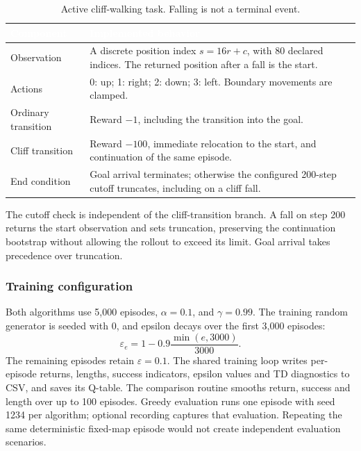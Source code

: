 \documentclass[11pt,a4paper]{article}
\theoremstyle{definition}
\theoremstyle{plain}
\theoremstyle{remark}
\newcommand{\thcell}[1]{\textcolor{white}{\textbf{#1}}}
\begin{document}
\begin{table}[tbp]
\centering\small
\begin{tabularx}{\linewidth}{@{}p{3.0cm}Y@{}}
\toprule
{}\thcell{Component}&\thcell{Implemented behavior}\\
\midrule
Observation & A discrete position index $s=16r+c$, with 80 declared indices. The returned position after a fall is the start.\\
 Actions & 0: up; 1: right; 2: down; 3: left. Boundary movements are clamped.\\
Ordinary transition & Reward $-1$, including the transition into the goal.\\
 Cliff transition & Reward $-100$, immediate relocation to the start, and continuation of the same episode.\\
End condition & Goal arrival terminates; otherwise the configured 200-step cutoff truncates, including on a cliff fall.\\
\bottomrule
\end{tabularx}
\caption{Active cliff-walking task. Falling is not a terminal event.}
\label{tab:cliff-env}
\end{table}

The cutoff check is independent of the cliff-transition branch. A fall on step 200 returns the start observation and sets truncation, preserving the continuation bootstrap without allowing the rollout to exceed its limit. Goal arrival takes precedence over truncation.

\subsubsection{Training configuration}

Both algorithms use 5,000 episodes, $\alpha=0.1$, and $\gamma=0.99$. The training random generator is seeded with 0, and epsilon decays over the first 3,000 episodes:
\begin{equation}
 \varepsilon_e=1-0.9\frac{\min(e,3000)}{3000}.
 \label{eq:cliff-epsilon}
\end{equation}
The remaining episodes retain $\varepsilon=0.1$. The shared training loop writes per-episode returns, lengths, success indicators, epsilon values and TD diagnostics to CSV, and saves its Q-table. The comparison routine smooths return, success and length over up to 100 episodes. Greedy evaluation runs one episode with seed 1234 per algorithm; optional recording captures that evaluation. Repeating the same deterministic fixed-map episode would not create independent evaluation scenarios.
\end{document}
